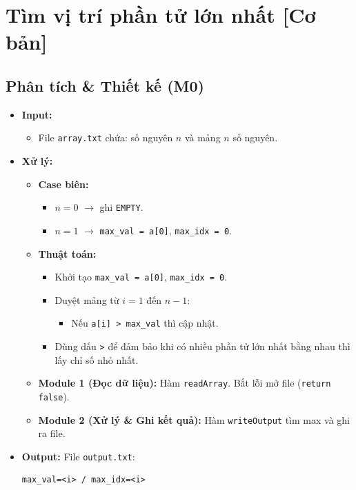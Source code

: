 \section{Tìm vị trí phần tử lớn nhất [Cơ bản]}

\subsection{Phân tích \& Thiết kế (M0)}
\begin{itemize}
    \item \textbf{Input:}
    \begin{itemize}
        \item File \texttt{array.txt} chứa: số nguyên $n$ và mảng $n$ số nguyên.
    \end{itemize}

    \item \textbf{Xử lý:}
    \begin{itemize}
        \item \textbf{Case biên:}
        \begin{itemize}
            \item $n = 0$ $\rightarrow$ ghi \texttt{EMPTY}.
            \item $n = 1$ $\rightarrow$ \texttt{max\_val = a[0]}, \texttt{max\_idx = 0}.
        \end{itemize}

        \item \textbf{Thuật toán:}
        \begin{itemize}
            \item Khởi tạo \texttt{max\_val = a[0]}, \texttt{max\_idx = 0}.
            \item Duyệt mảng từ $i = 1$ đến $n-1$:
            \begin{itemize}
                \item Nếu \texttt{a[i] > max\_val} thì cập nhật.
            \end{itemize}
            \item Dùng dấu \texttt{>} để đảm bảo khi có nhiều phần tử lớn nhất bằng nhau thì lấy chỉ số nhỏ nhất.
        \end{itemize}

        \item \textbf{Module 1 (Đọc dữ liệu):} Hàm \texttt{readArray}. Bắt lỗi mở file (\texttt{return false}).
        \item \textbf{Module 2 (Xử lý \& Ghi kết quả):} Hàm \texttt{writeOutput} tìm max và ghi ra file.
    \end{itemize}

    \item \textbf{Output:}
    File \texttt{output.txt}:
\begin{lstlisting}
max_val=<i> / max_idx=<i>
\end{lstlisting}
\end{itemize}

